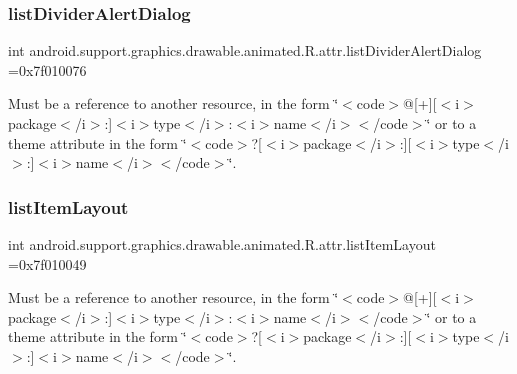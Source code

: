 \subsubsection{\texorpdfstring{list\+Divider\+Alert\+Dialog}{listDividerAlertDialog}}
{\footnotesize\ttfamily int android.\+support.\+graphics.\+drawable.\+animated.\+R.\+attr.\+list\+Divider\+Alert\+Dialog =0x7f010076\hspace{0.3cm}{\ttfamily [static]}}

Must be a reference to another resource, in the form \char`\"{}$<$code$>$@\mbox{[}+\mbox{]}\mbox{[}$<$i$>$package$<$/i$>$\+:\mbox{]}$<$i$>$type$<$/i$>$\+:$<$i$>$name$<$/i$>$$<$/code$>$\char`\"{} or to a theme attribute in the form \char`\"{}$<$code$>$?\mbox{[}$<$i$>$package$<$/i$>$\+:\mbox{]}\mbox{[}$<$i$>$type$<$/i$>$\+:\mbox{]}$<$i$>$name$<$/i$>$$<$/code$>$\char`\"{}. \mbox{\label{classandroid_1_1support_1_1graphics_1_1drawable_1_1animated_1_1R_1_1attr_a1a90f77ae00d26c8c8c3fe2bba69f5b5}} 
\subsubsection{\texorpdfstring{list\+Item\+Layout}{listItemLayout}}
{\footnotesize\ttfamily int android.\+support.\+graphics.\+drawable.\+animated.\+R.\+attr.\+list\+Item\+Layout =0x7f010049\hspace{0.3cm}{\ttfamily [static]}}

Must be a reference to another resource, in the form \char`\"{}$<$code$>$@\mbox{[}+\mbox{]}\mbox{[}$<$i$>$package$<$/i$>$\+:\mbox{]}$<$i$>$type$<$/i$>$\+:$<$i$>$name$<$/i$>$$<$/code$>$\char`\"{} or to a theme attribute in the form \char`\"{}$<$code$>$?\mbox{[}$<$i$>$package$<$/i$>$\+:\mbox{]}\mbox{[}$<$i$>$type$<$/i$>$\+:\mbox{]}$<$i$>$name$<$/i$>$$<$/code$>$\char`\"{}. \mbox{\label{classandroid_1_1support_1_1graphics_1_1drawable_1_1animated_1_1R_1_1attr_a4fceaa3d5b71546b7c3475308c2f201d}} 
